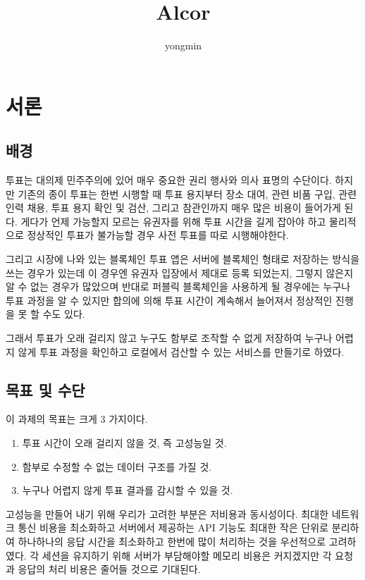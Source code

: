 \documentclass[8pt,a4paper,left=8mm,right=8mm,top=10mm,bottom=10mm]{article}
\title{Alcor}
\author{yongmin}
\begin{document}
\maketitle

\tableofcontents
\listoffigures

\newpage
\section{서론}

\subsection{배경}

투표는 대의제 민주주의에 있어 매우 중요한 권리 행사와 의사 표명의 수단이다. 하지만 기존의 종이 투표는 한번 시행할 때 투표 용지부터 장소 대여, 관련 비품 구입, 관련 인력 채용, 투표 용지 확인 및 검산, 그리고 참관인까지 매우 많은 비용이 들어가게 된다. 게다가 언제 가능할지 모르는 유권자를 위해 투표 시간을 길게 잡아야 하고 물리적으로 정상적인 투표가 불가능할 경우 사전 투표를 따로 시행해야한다.

그리고 시장에 나와 있는 블록체인 투표 앱은 서버에 블록체인 형태로 저장하는 방식을 쓰는 경우가 있는데 이 경우엔 유권자 입장에서 제대로 등록 되었는지, 그렇지 않은지 알 수 없는 경우가 많았으며 반대로 퍼블릭 블록체인을 사용하게 될 경우에는 누구나 투표 과정을 알 수 있지만 합의에 의해 투표 시간이 계속해서 늘어져서 정상적인 진행을 못 할 수도 있다.

그래서 투표가 오래 걸리지 않고 누구도 함부로 조작할 수 없게 저장하여 누구나 어렵지 않게 투표 과정을 확인하고 로컬에서 검산할 수 있는 서비스를 만들기로 하였다.

\subsection{목표 및 수단}

이 과제의 목표는 크게 3 가지이다.
\begin{enumerate}
 \item 투표 시간이 오래 걸리지 않을 것, 즉 고성능일 것.
 \item 함부로 수정할 수 없는 데이터 구조를 가질 것.
 \item 누구나 어렵지 않게 투표 결과를 감시할 수 있을 것.
\end{enumerate}

고성능을 만들어 내기 위해 우리가 고려한 부분은 저비용과 동시성이다. 최대한 네트워크 통신 비용을 최소화하고 서버에서 제공하는 API 기능도 최대한 작은 단위로 분리하여 하나하나의 응답 시간을 최소화하고 한번에 많이 처리하는 것을 우선적으로 고려하였다. 각 세션을 유지하기 위해 서버가 부담해야할 메모리 비용은 커지겠지만 각 요청과 응답의 처리 비용은 줄어들 것으로 기대된다.
\end{document}
